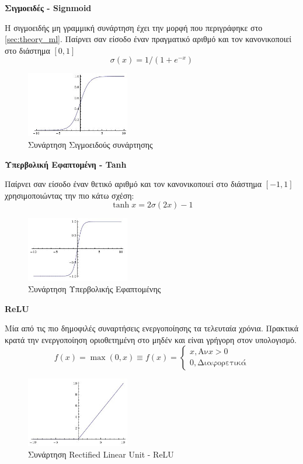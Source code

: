 \textbf{Σιγμοειδές - Signmoid}

Η σιγμοειδής μη γραμμική συνάρτηση έχει την μορφή που περιγράφηκε στο \autoref{sec:theory_ml}.
Παίρνει σαν είσοδο έναν πραγματικό αριθμό και τον κανονικοποιεί στο διάστημα $[0, 1]$
\[
  \sigma(x) = 1 / (1 + e^{-x})
\]

\begin{figure}[!ht]
  \centering
  \includegraphics[width=0.4\textwidth]{./images/chapter3/sigmoid.jpg}
  \caption[Συνάρτηση Σιγμοειδούς συνάρτησης]{Συνάρτηση Σιγμοειδούς συνάρτησης}
  \label{fig:sigmoid}
\end{figure}

\textbf{Υπερβολική Εφαπτομένη - Tanh}

Παίρνει σαν είσοδο έναν θετικό αριθμό και τον κανονικοποιεί στο διάστημα $[-1, 1]$
χρησιμοποιώντας την πιο κάτω σχέση:
\[
  \tanh{x} = 2\sigma(2x) - 1
\]

\begin{figure}[!ht]
  \centering
  \includegraphics[width=0.4\textwidth]{./images/chapter3/tanh.jpg}
  \caption[Συνάρτηση Υπερβολικής Εφαπτωμένης]{Συνάρτηση Υπερβολικής Εφαπτομένης}
  \label{fig:tanh}
\end{figure}

\textbf{ReLU}

Μία από τις πιο δημοφιλές συναρτήσεις ενεργοποίησης τα τελευταία χρόνια.
Πρακτικά κρατά την ενεργοποίηση οριοθετημένη στο μηδέν και είναι
γρήγορη στον υπολογισμό.
\[
  f(x) = \max(0, x) \equiv f(x) =
  \begin{cases}
    x, \text{Αν} x > 0 \\
    0, \text{Διαφορετικά}
  \end{cases}
\]

\begin{figure}[!ht]
  \centering
  \includegraphics[width=0.4\textwidth]{./images/chapter3/relu.jpg}
  \caption[Συνάρτηση Rectified Linear Unit - ReLU]{Συνάρτηση Rectified Linear Unit - ReLU}
  \label{fig:relu}
\end{figure}

